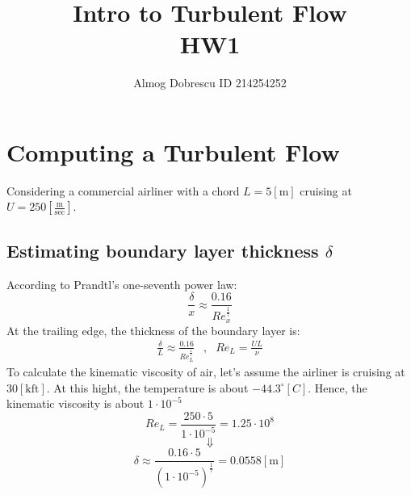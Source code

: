 \documentclass[11pt, a4paper]{article}
\title{Intro to Turbulent Flow \\ HW1}
\author{Almog Dobrescu ID 214254252}
\begin{document}
\thispagestyle{empty}
\maketitle
\newpage


\tableofcontents
\vfil
\listoffigures
\vfil
\lstlistoflistings
\newpage

\printnomenclature
\newpage

\pagestyle{fancy}
\setcounter{page}{1}

\section{Computing a Turbulent Flow}
Considering a commercial airliner with a chord $L=5\left[\mathrm{m}\right]$ cruising at $U=250\left[\frac{\mathrm{m}}{\mathrm{sec}}\right]$.

\subsection{Estimating boundary layer thickness $\delta$}
According to Prandtl's one-seventh power law:
\begin{equation}
    \frac{\delta}{x}\approx\frac{0.16}{Re_x^\frac{1}{7}}
\end{equation}
At the trailing edge, the thickness of the boundary layer is:
\begin{equation}
    \begin{matrix}
        \displaystyle\frac{\delta}{L}\approx\frac{0.16}{Re_L^\frac{1}{7}} &,& \displaystyle Re_L=\frac{UL}{\nu}
    \end{matrix}
\end{equation}
To calculate the kinematic viscosity of air, let's assume the airliner is cruising at $30[\mathrm{kft}]$. At this hight, the temperature is about $-44.3^\circ[C]$\cite{temp_distribution_at_atmosphere}. Hence, the kinematic viscosity is about $1\cdot10^{-5}$\cite{air_properties}
\begin{equation}
    Re_L=\frac{250\cdot5}{1\cdot10^{-5}}=1.25\cdot10^8
\end{equation}
\begin{equation*}
    \Downarrow
\end{equation*}
\begin{equation}
    \delta\approx\frac{0.16\cdot5}{\left(1\cdot10^{-5}\right)^\frac{1}{7}}=0.0558[\mathrm{m}]
\end{equation}
\end{document}
